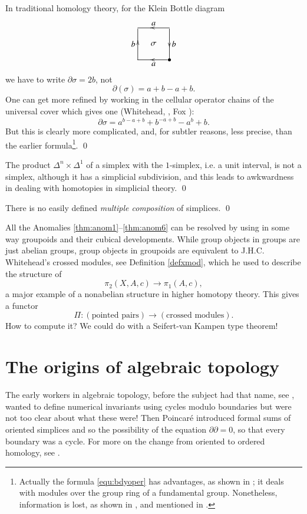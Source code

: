 \documentclass{elsarticle}
\def\xybiglabels{\def\labelstyle{\textstyle}}
\begin{document}
\begin{anomaly}\label{thm:anom4}
In traditional homology theory,  for the  Klein Bottle diagram
    $$\xybiglabels \xymatrix@M=0pt@=3pc{   \ar @{} [dr]|\sigma &\ar @{-} [l]_a|(0.6)\tip \ar @{-} [d]|(0.6)\tip ^b\\
 \ar@{-}  [u]|(0.6)\tip^b & \bullet  \ar@{-}  [l]|(0.6)\tip^a }$$
    we  have to write $\partial \sigma= 2b$, not
$$\partial (\sigma)= a+b -a+b .$$
One can get more refined by working in the cellular operator chains of the universal cover which gives one (Whitehead, \cite{W49CHII},  Fox \cite{CF63}):
\begin{equation}\label{equ:bdyoper}
  \partial \sigma= a^{b-a+b} +b^{-a+b}-a^b +b.
\end{equation}
But this is clearly  more complicated,  and,  for subtler reasons,  less precise,   than the earlier formula\footnote{Actually the  formula \eqref{equ:bdyoper} has advantages, as shown in \cite{CF63}; it deals with modules over the group ring of a fundamental group. Nonetheless, information is lost, as shown in \cite[Section 7.4.v]{BHS}, and mentioned in \cite{W49CHII}.}. \qed
\end{anomaly}
\begin{anomaly} \label{thm:anom5}The product $\Delta^n \times \Delta^1$ of a simplex with the $1$-simplex, i.e. a unit interval, is not a simplex, although it has a simplicial subdivision, and this leads to awkwardness in dealing with homotopies in simplicial theory. \qed
\end{anomaly}
\begin{anomaly}\label{thm:anom6}
      There is no easily defined {\it multiple  composition} of simplices. \qed
\end{anomaly}


All the  Anomalies \ref{thm:anom1}--\ref{thm:anom6}  can be resolved  by using  in some way groupoids
 and their cubical  developments. While group objects in groups are just abelian groups, group objects in groupoids are equivalent to J.H.C. Whitehead's
 crossed modules, see  Definition \ref{defxmod},  which he used to describe the structure of  $$\pi_2(X,A,c) \to \pi_1(A,c), $$
 a major  example of a nonabelian structure in higher homotopy theory. This gives a functor $$\Pi: (\text{pointed pairs} ) \to (\text{crossed modules}).$$
How to compute it? We could do with  a Seifert-van Kampen type theorem!

\section{The origins of algebraic topology}\label{sec:orig}
The early workers in algebraic topology, before the subject had that name, see \cite{Di},  wanted to define numerical invariants using cycles modulo boundaries but
were not too clear about what these were!  Then Poincar\'e introduced formal sums of oriented
simplices and so the possibility of the equation $\partial \partial =0$, so that every boundary was a cycle. For more on the change from oriented to ordered  homology, see \cite{Bar95}.
\end{document}

